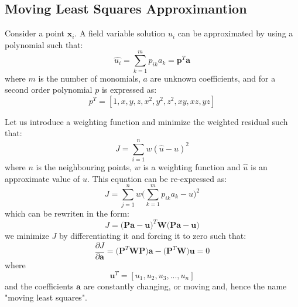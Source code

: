 \documentclass[12pt]{extarticle}
\begin{document}
\subsection{Moving Least Squares Approximantion}
Consider a point $\textbf{x}_{i}$. A field variable solution $u_{i}$ can be approximated by using a polynomial such that:
\begin{equation}
    \hat{u_{i}} = \sum_{k=1}^{m}p_{ik}a_{k} = \textbf{p}^{T} \textbf{a}
\label{rmls}
\end{equation}
where $m$ is the number of monomials, $a$ are unknown coefficients, and for a second order polynomial $p$ is expressed as:
\begin{equation}
    p^{T} = [1, x, y, z, x^{2}, y^{2}, z^{2}, xy, xz, yz]
\end{equation}

Let us introduce a weighting function and minimize the weighted residual such that:
\begin{equation}
J = \sum_{i=1}^{n} w(\hat{u}-u)^{2}
\end{equation}
where $n$ is the neighbouring points, $w$ is a weighting function and $\hat{u}$ is an approximate value of $u$. This equation can be re-expressed as:
\begin{equation}
J = \sum_{j=1}^{n} w \Big( \sum_{k=1}^{m} p_{ik}a_{k} - u \Big)^{2}
\end{equation}
which can be rewriten in the form:
\begin{equation}
J = \Big(\textbf{P} \textbf{a} - \textbf{u} \Big)^{T} \textbf{W} \Big(\textbf{P}\textbf{a}-\textbf{u}\Big)
\end{equation}
we minimize $J$ by differentiating it and forcing it to zero such that:
\begin{equation}
\frac{\partial J}{\partial \textbf{a}} = \Big( \textbf{P}^{T}\textbf{W}\textbf{P} \Big) \textbf{a} - \Big(\textbf{P}^{T}\textbf{W} \Big) \textbf{u} = 0
\end{equation}
where 
\begin{equation}
\textbf{u}^{T} = [u_{1}, u_{2}, u_{3}, ..., u_{n}]
\end{equation}
and the coefficients $\textbf{a}$ are constantly changing, or moving and, hence the name "moving least squares". 
\end{document}
